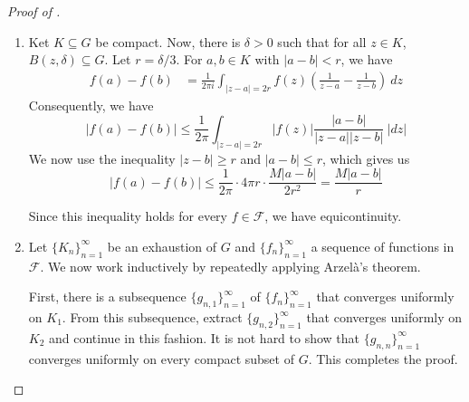 \begin{proof}[Proof of ]
\begin{enumerate}[label=(\alph*)]
\item Ket $K\subseteq G$ be compact. Now, there is $\delta > 0$ such that for all $z\in K$, $B(z,\delta)\subseteq G$. Let $r = \delta/3$. For $a,b\in K$ with $|a - b| < r$, we have 
\begin{align*}
    f(a) - f(b) &= \frac{1}{2\pi i}\int_{|z - a| = 2r}f(z)\left(\frac{1}{z - a} - \frac{1}{z - b}\right)~dz
\end{align*}
Consequently, we have 
\begin{equation*}
    |f(a) - f(b)| \le\frac{1}{2\pi}\int_{|z - a| = 2r}|f(z)|\frac{|a - b|}{|z - a||z - b|}~|dz|
\end{equation*}
We now use the inequality $|z - b|\ge r$ and $|a - b|\le r$, which gives us 
\begin{equation*}
    |f(a) - f(b)|\le\frac{1}{2\pi}\cdot 4\pi r\cdot\frac{M|a - b|}{2r^2} = \frac{M|a - b|}{r}
\end{equation*}

Since this inequality holds for every $f\in\mathcal F$, we have equicontinuity.

\item Let $\{K_n\}_{n = 1}^\infty$ be an exhaustion of $G$ and $\{f_n\}_{n = 1}^\infty$ a sequence of functions in $\mathcal F$. We now work inductively by repeatedly applying Arzel\`a's theorem. 

First, there is a subsequence $\{g_{n,1}\}_{n = 1}^\infty$ of $\{f_n\}_{n = 1}^\infty$ that converges uniformly on $K_1$. From this subsequence, extract $\{g_{n,2}\}_{n = 1}^\infty$ that converges uniformly on $K_2$ and continue in this fashion. It is not hard to show that $\{g_{n,n}\}_{n = 1}^\infty$ converges uniformly on every compact subset of $G$. This completes the proof.
\end{enumerate}
\end{proof}

